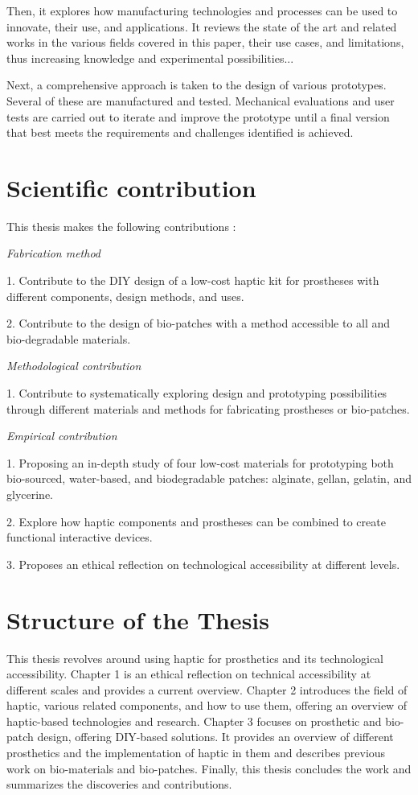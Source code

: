 Then, it explores how manufacturing technologies and processes can be used to innovate, their use, and applications. It reviews the state of the art and related works in the various fields covered in this paper, their use cases, and limitations, thus increasing knowledge and experimental possibilities...

Next, a comprehensive approach is taken to the design of various prototypes. Several of these are manufactured and tested. Mechanical evaluations and user tests are carried out to iterate and improve the prototype until a final version that best meets the requirements and challenges identified is achieved.

\section{Scientific contribution}
This thesis makes the following contributions :

\textit{Fabrication method}

\item 1. Contribute to the DIY design of a low-cost haptic kit for prostheses with different components, design methods, and uses.
\item 2. Contribute to the design of bio-patches with a method accessible to all and bio-degradable materials.

\textit{Methodological contribution}

\item 1. Contribute to systematically exploring design and prototyping possibilities through different materials and methods for fabricating prostheses or bio-patches.

\textit{Empirical contribution}

\item 1. Proposing an in-depth study of four low-cost materials for prototyping both bio-sourced, water-based, and biodegradable patches: alginate, gellan, gelatin, and glycerine. 
\item 2. Explore how haptic components and prostheses can be combined to create functional interactive devices.
\item 3. Proposes an ethical reflection on technological accessibility at different levels.

\section{Structure of the Thesis}
This thesis revolves around using haptic for prosthetics and its technological accessibility. Chapter 1 is an ethical reflection on technical accessibility at different scales and provides a current overview. Chapter 2 introduces the field of haptic, various related components, and how to use them, offering an overview of haptic-based technologies and research. Chapter 3 focuses on prosthetic and bio-patch design, offering DIY-based solutions. It provides an overview of different prosthetics and the implementation of haptic in them and describes previous work on bio-materials and bio-patches. Finally, this thesis concludes the work and summarizes the discoveries and contributions.